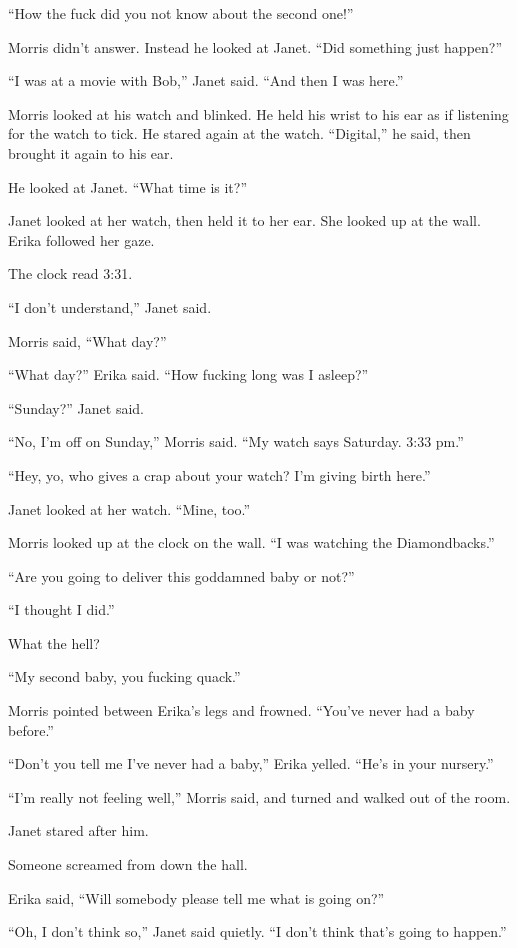 ``How the fuck did you not know about the second one!''

Morris didn't answer. Instead he looked at Janet. ``Did something just happen?''

``I was at a movie with Bob,'' Janet said. ``And then I was here.''

Morris looked at his watch and blinked. He held his wrist to his ear as if listening for the watch to tick. He stared again at the watch. ``Digital,'' he said, then brought it again to his ear.

He looked at Janet. ``What time is it?''

Janet looked at her watch, then held it to her ear. She looked up at the wall. Erika followed her gaze.

The clock read 3:31.

``I don't understand,'' Janet said.

Morris said, ``What day?''

``What day?'' Erika said. ``How fucking long was I asleep?''

``Sunday?'' Janet said.

``No, I'm off on Sunday,'' Morris said. ``My watch says Saturday. 3:33 pm.''

``Hey, yo, who gives a crap about your watch? I'm giving birth here.''

Janet looked at her watch. ``Mine, too.''

Morris looked up at the clock on the wall. ``I was watching the Diamondbacks.''

``Are you going to deliver this goddamned baby or not?''

``I thought I did.''

What the hell?

``My second baby, you fucking quack.''

Morris pointed between Erika's legs and frowned. ``You've never had a baby before.''

``Don't you tell me I've never had a baby,'' Erika yelled. ``He's in your nursery.''

``I'm really not feeling well,'' Morris said, and turned and walked out of the room.

Janet stared after him.

Someone screamed from down the hall.

Erika said, ``Will somebody please tell me what is going on?''

``Oh, I don't think so,'' Janet said quietly. ``I don't think that's going to happen.''



